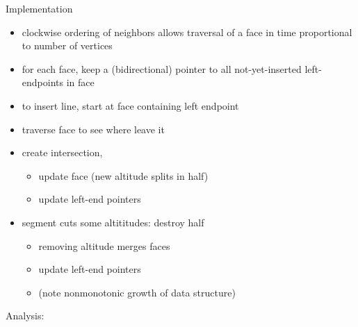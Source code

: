 \documentclass{article}
\begin{document}
Implementation
\begin{itemize}
\item clockwise ordering of neighbors allows traversal of a face in
  time proportional to number of vertices
\item for each face, keep a (bidirectional) pointer to all not-yet-inserted
  left-endpoints in face
\item to insert line, start at face containing left endpoint
\item traverse face to see where leave it
\item create intersection, 
  \begin{itemize}
  \item update face (new altitude splits in half)
  \item update left-end pointers
  \end{itemize}
\item segment cuts some altititudes: destroy half
  \begin{itemize}
  \item removing altitude merges faces
  \item update left-end pointers
  \item (note nonmonotonic growth of data structure)
  \end{itemize}
\end{itemize}
Analysis:
\end{document}
